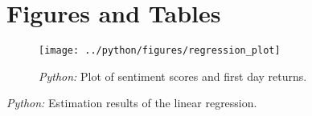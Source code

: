 \documentclass[11pt, a4paper, leqno]{article}
\begin{document}
\section{Figures and Tables}
\label{sec:Figures and Tables}

\begin{figure}[H]

    \centering
    \texttt{[image: ../python/figures/regression\_plot]}

    \caption{\emph{Python:} Plot of sentiment scores and first day returns.}
    \label{fig:python-predictions}

\end{figure}

\begin{table}[H]
    
    \caption{\label{tab:python-summary}\emph{Python:} Estimation results of the
        linear regression.}
\end{table}






\printbibliography
{}



\end{document}
